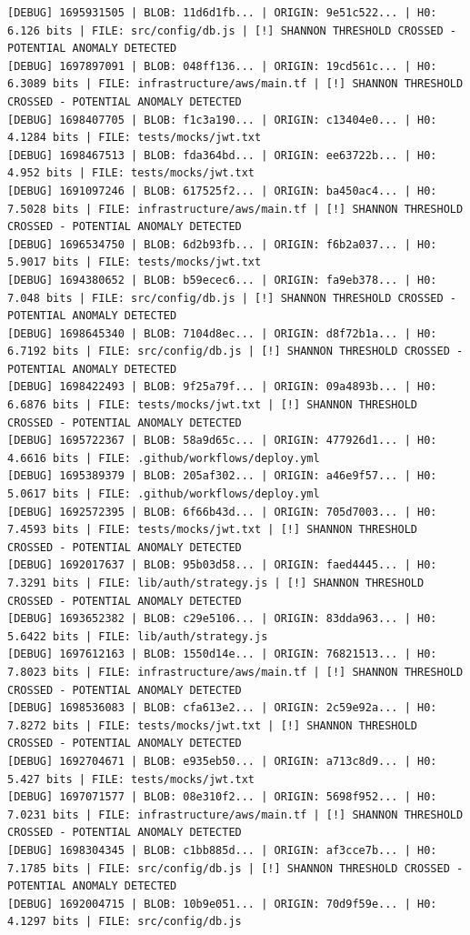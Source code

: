 \documentclass[12pt, a4paper, oneside]{report}
\begin{document}
\begin{lstlisting}[basicstyle=\tiny\ttfamily]
[DEBUG] 1695931505 | BLOB: 11d6d1fb... | ORIGIN: 9e51c522... | H0: 6.126 bits | FILE: src/config/db.js | [!] SHANNON THRESHOLD CROSSED - POTENTIAL ANOMALY DETECTED
[DEBUG] 1697897091 | BLOB: 048ff136... | ORIGIN: 19cd561c... | H0: 6.3089 bits | FILE: infrastructure/aws/main.tf | [!] SHANNON THRESHOLD CROSSED - POTENTIAL ANOMALY DETECTED
[DEBUG] 1698407705 | BLOB: f1c3a190... | ORIGIN: c13404e0... | H0: 4.1284 bits | FILE: tests/mocks/jwt.txt
[DEBUG] 1698467513 | BLOB: fda364bd... | ORIGIN: ee63722b... | H0: 4.952 bits | FILE: tests/mocks/jwt.txt
[DEBUG] 1691097246 | BLOB: 617525f2... | ORIGIN: ba450ac4... | H0: 7.5028 bits | FILE: infrastructure/aws/main.tf | [!] SHANNON THRESHOLD CROSSED - POTENTIAL ANOMALY DETECTED
[DEBUG] 1696534750 | BLOB: 6d2b93fb... | ORIGIN: f6b2a037... | H0: 5.9017 bits | FILE: tests/mocks/jwt.txt
[DEBUG] 1694380652 | BLOB: b59ecec6... | ORIGIN: fa9eb378... | H0: 7.048 bits | FILE: src/config/db.js | [!] SHANNON THRESHOLD CROSSED - POTENTIAL ANOMALY DETECTED
[DEBUG] 1698645340 | BLOB: 7104d8ec... | ORIGIN: d8f72b1a... | H0: 6.7192 bits | FILE: src/config/db.js | [!] SHANNON THRESHOLD CROSSED - POTENTIAL ANOMALY DETECTED
[DEBUG] 1698422493 | BLOB: 9f25a79f... | ORIGIN: 09a4893b... | H0: 6.6876 bits | FILE: tests/mocks/jwt.txt | [!] SHANNON THRESHOLD CROSSED - POTENTIAL ANOMALY DETECTED
[DEBUG] 1695722367 | BLOB: 58a9d65c... | ORIGIN: 477926d1... | H0: 4.6616 bits | FILE: .github/workflows/deploy.yml
[DEBUG] 1695389379 | BLOB: 205af302... | ORIGIN: a46e9f57... | H0: 5.0617 bits | FILE: .github/workflows/deploy.yml
[DEBUG] 1692572395 | BLOB: 6f66b43d... | ORIGIN: 705d7003... | H0: 7.4593 bits | FILE: tests/mocks/jwt.txt | [!] SHANNON THRESHOLD CROSSED - POTENTIAL ANOMALY DETECTED
[DEBUG] 1692017637 | BLOB: 95b03d58... | ORIGIN: faed4445... | H0: 7.3291 bits | FILE: lib/auth/strategy.js | [!] SHANNON THRESHOLD CROSSED - POTENTIAL ANOMALY DETECTED
[DEBUG] 1693652382 | BLOB: c29e5106... | ORIGIN: 83dda963... | H0: 5.6422 bits | FILE: lib/auth/strategy.js
[DEBUG] 1697612163 | BLOB: 1550d14e... | ORIGIN: 76821513... | H0: 7.8023 bits | FILE: infrastructure/aws/main.tf | [!] SHANNON THRESHOLD CROSSED - POTENTIAL ANOMALY DETECTED
[DEBUG] 1698536083 | BLOB: cfa613e2... | ORIGIN: 2c59e92a... | H0: 7.8272 bits | FILE: tests/mocks/jwt.txt | [!] SHANNON THRESHOLD CROSSED - POTENTIAL ANOMALY DETECTED
[DEBUG] 1692704671 | BLOB: e935eb50... | ORIGIN: a713c8d9... | H0: 5.427 bits | FILE: tests/mocks/jwt.txt
[DEBUG] 1697071577 | BLOB: 08e310f2... | ORIGIN: 5698f952... | H0: 7.0231 bits | FILE: infrastructure/aws/main.tf | [!] SHANNON THRESHOLD CROSSED - POTENTIAL ANOMALY DETECTED
[DEBUG] 1698304345 | BLOB: c1bb885d... | ORIGIN: af3cce7b... | H0: 7.1785 bits | FILE: src/config/db.js | [!] SHANNON THRESHOLD CROSSED - POTENTIAL ANOMALY DETECTED
[DEBUG] 1692004715 | BLOB: 10b9e051... | ORIGIN: 70d9f59e... | H0: 4.1297 bits | FILE: src/config/db.js
\end{lstlisting}
\end{document}
